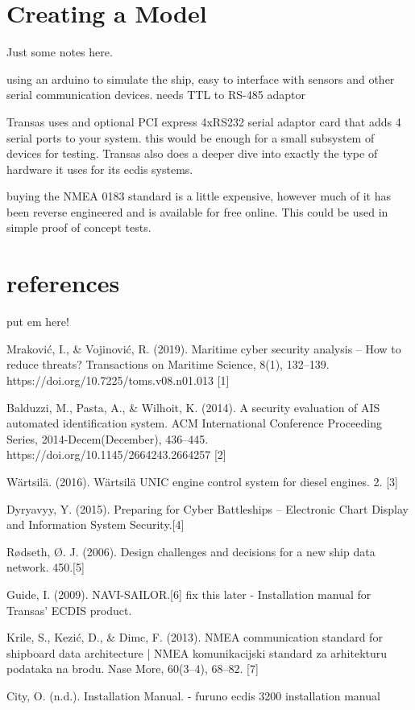 \documentclass{report}
\begin{document}
\chapter{Creating a Model}

Just some notes here.

using an arduino to simulate the ship, easy to interface with sensors and other serial communication devices. needs TTL to RS-485 adaptor 

Transas uses and optional PCI express 4xRS232 serial adaptor card that adds 4 serial ports to your system. this would be enough for a small subsystem of devices for testing. Transas also does a deeper dive into exactly the type of hardware it uses for its ecdis systems.

buying the NMEA 0183 standard is a little expensive, however much of it has been reverse engineered and is available for free online. This could be used in simple proof of concept tests.

\chapter{references}
put em here!

Mraković, I., \& Vojinović, R. (2019). Maritime cyber security analysis – How to reduce threats? Transactions on Maritime Science, 8(1), 132–139. https://doi.org/10.7225/toms.v08.n01.013 [1]

Balduzzi, M., Pasta, A., \& Wilhoit, K. (2014). A security evaluation of AIS automated identification system. ACM International Conference Proceeding Series, 2014-Decem(December), 436–445. https://doi.org/10.1145/2664243.2664257 [2]

Wärtsilä. (2016). Wärtsilä UNIC engine control system for diesel engines. 2. [3]

Dyryavyy, Y. (2015). Preparing for Cyber Battleships – Electronic Chart Display and Information System Security.[4]

Rødseth, Ø. J. (2006). Design challenges and decisions for a new ship data network. 450.[5]

Guide, I. (2009). NAVI-SAILOR.[6] fix this later - Installation manual for Transas' ECDIS product.

Krile, S., Kezić, D., \& Dimc, F. (2013). NMEA communication standard for shipboard data architecture | NMEA komunikacijski standard za arhitekturu podataka na brodu. Nase More, 60(3–4), 68–82. [7]

City, O. (n.d.). Installation Manual. - furuno ecdis 3200 installation manual
\end{document}

